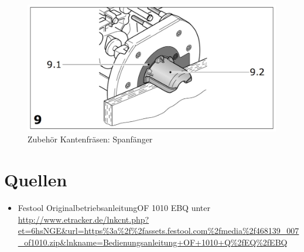 \documentclass{\basedir/fablab-document}
\begin{document}
\begin{figure}[]
	\centering
	\includegraphics[width=1\textwidth]{img/festool_11.jpg}
	\caption{Zubehör Kantenfräsen: Spanfänger}
	\label{fig:bilder10}
\end{figure}

\newpage
\section{Quellen}
\begin{itemize}
\item Festool \glqq Originalbetriebsanleitung\grqq OF 1010 EBQ unter 
\url{http://www.etracker.de/lnkcnt.php?et=6hsNGE&url=https%3a%2f%2fassets.festool.com%2fmedia%2f468139_007_of1010.zip&lnkname=Bedienungsanleitung+OF+1010+Q%2fEQ%2fEBQ}
\end{itemize}
\end{document}
